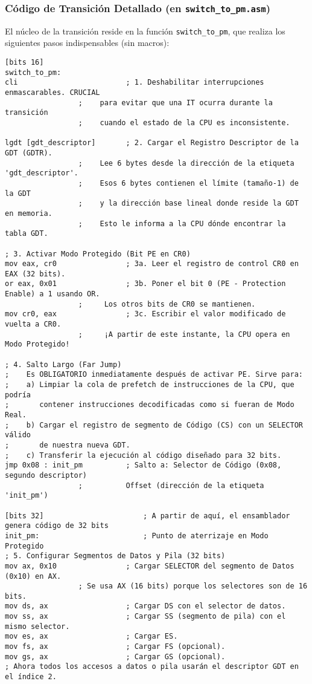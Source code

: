 \subsubsection{Código de Transición Detallado (en \texttt{switch\_to\_pm.asm})}

El núcleo de la transición reside en la función \texttt{switch\_to\_pm}, que realiza los siguientes pasos indispensables (sin macros):

\begin{lstlisting}[style=NasmStyle,
    caption={\texttt{switch\_to\_pm.asm} (Núcleo de la transición)}]
[bits 16]
switch_to_pm:
cli                         ; 1. Deshabilitar interrupciones enmascarables. CRUCIAL
                 ;    para evitar que una IT ocurra durante la transición
                 ;    cuando el estado de la CPU es inconsistente.

lgdt [gdt_descriptor]       ; 2. Cargar el Registro Descriptor de la GDT (GDTR).
                 ;    Lee 6 bytes desde la dirección de la etiqueta 'gdt_descriptor'.
                 ;    Esos 6 bytes contienen el límite (tamaño-1) de la GDT
                 ;    y la dirección base lineal donde reside la GDT en memoria.
                 ;    Esto le informa a la CPU dónde encontrar la tabla GDT.

; 3. Activar Modo Protegido (Bit PE en CR0)
mov eax, cr0                ; 3a. Leer el registro de control CR0 en EAX (32 bits).
or eax, 0x01                ; 3b. Poner el bit 0 (PE - Protection Enable) a 1 usando OR.
                 ;     Los otros bits de CR0 se mantienen.
mov cr0, eax                ; 3c. Escribir el valor modificado de vuelta a CR0.
                 ;     ¡A partir de este instante, la CPU opera en Modo Protegido!

; 4. Salto Largo (Far Jump)
;    Es OBLIGATORIO inmediatamente después de activar PE. Sirve para:
;    a) Limpiar la cola de prefetch de instrucciones de la CPU, que podría
;       contener instrucciones decodificadas como si fueran de Modo Real.
;    b) Cargar el registro de segmento de Código (CS) con un SELECTOR válido
;       de nuestra nueva GDT.
;    c) Transferir la ejecución al código diseñado para 32 bits.
jmp 0x08 : init_pm          ; Salto a: Selector de Código (0x08, segundo descriptor)
                 ;          Offset (dirección de la etiqueta 'init_pm')

[bits 32]                       ; A partir de aquí, el ensamblador genera código de 32 bits
init_pm:                        ; Punto de aterrizaje en Modo Protegido
; 5. Configurar Segmentos de Datos y Pila (32 bits)
mov ax, 0x10                ; Cargar SELECTOR del segmento de Datos (0x10) en AX.
                 ; Se usa AX (16 bits) porque los selectores son de 16 bits.
mov ds, ax                  ; Cargar DS con el selector de datos.
mov ss, ax                  ; Cargar SS (segmento de pila) con el mismo selector.
mov es, ax                  ; Cargar ES.
mov fs, ax                  ; Cargar FS (opcional).
mov gs, ax                  ; Cargar GS (opcional).
; Ahora todos los accesos a datos o pila usarán el descriptor GDT en el índice 2.


\end{lstlisting}

